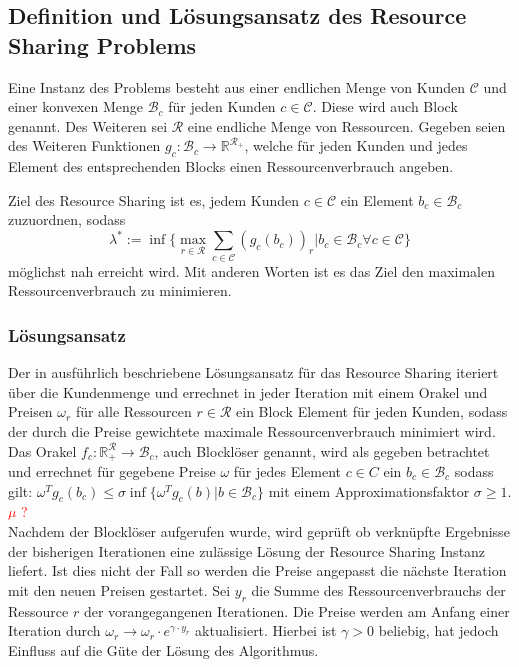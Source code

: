 \documentclass[11pt, a4paper, german]{article}
\begin{document}
\subsection{Definition und Lösungsansatz des Resource Sharing Problems}

Eine Instanz des Problems besteht aus einer endlichen Menge von Kunden $\mathcal{C}$ und einer konvexen Menge $\mathcal{B}_c$ für jeden Kunden $c\in \mathcal{C}$. Diese wird auch Block genannt. Des Weiteren sei $\mathcal{R}$ eine endliche Menge von Ressourcen. Gegeben seien des Weiteren Funktionen $g_c : \mathcal{B}_ c \rightarrow \mathbb{R}^{\mathcal{R}_+}$, welche für jeden Kunden und jedes Element des entsprechenden Blocks einen Ressourcenverbrauch angeben.

Ziel des Resource Sharing ist es, jedem Kunden $c \in \mathcal{C}$ ein Element $b_c \in \mathcal{B}_c$ zuzuordnen, sodass 
\[ \lambda^* := \inf \{ \max\limits_{r \in \mathcal{R}} \sum\limits_{c \in \mathcal{C}}  (g_c(b_c))_r | b_c \in \mathcal{B}_c \forall c \in \mathcal{C} \} \]
möglichst nah erreicht wird. Mit anderen Worten ist es das Ziel den maximalen Ressourcenverbrauch zu minimieren. 

\subsubsection{Lösungsansatz}
Der in \cite{Vygen2011} ausführlich beschriebene Lösungsansatz für das Resource Sharing iteriert über die Kundenmenge und errechnet in jeder Iteration mit einem Orakel und Preisen $\omega _r$ für alle Ressourcen $r \in \mathcal{R}$ ein Block Element für jeden Kunden, sodass der durch die Preise gewichtete maximale Ressourcenverbrauch minimiert wird.\\
Das Orakel $f_c : \mathbb{R}^\mathcal{R}_+ \rightarrow \mathcal{B}_c$, auch Blocklöser genannt, wird als gegeben betrachtet und errechnet für gegebene Preise $\omega$ für jedes Element $c \in C$ ein $b_c \in \mathcal{B}_c$ sodass gilt: $ \omega ^T g_c(b_c) \leq \sigma \inf \{ \omega ^T g_c(b) | b \in \mathcal{B}_c \}$ mit einem Approximationsfaktor $\sigma \geq 1$. \textcolor{red}{$\mu$ ?} \\
Nachdem der Blocklöser aufgerufen wurde, wird geprüft ob verknüpfte Ergebnisse der bisherigen Iterationen eine zulässige Lösung der Resource Sharing Instanz liefert. Ist dies nicht der Fall so werden die Preise angepasst die nächste Iteration mit den neuen Preisen gestartet. Sei $y_r$ die Summe des Ressourcenverbrauchs der Ressource $r$ der vorangegangenen Iterationen. Die Preise werden am Anfang einer Iteration durch $\omega _r \rightarrow \omega _r \cdot e^{\gamma \cdot y_r}$ aktualisiert. Hierbei ist $\gamma > 0 $ beliebig, hat jedoch Einfluss auf die Güte der Lösung des Algorithmus.\\
\end{document}
